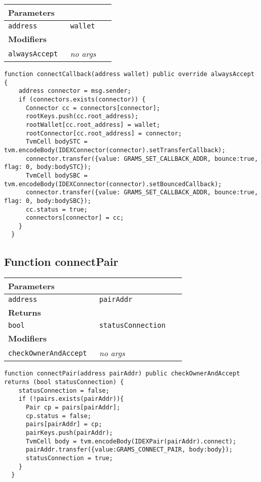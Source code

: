 \ifsoltables
\noindent\begin{tabular}{|l|l|p{5cm}|}\hline
\multicolumn{3}{|l|}{\bf Parameters}\\\hline
\tt address & \tt wallet &\\\hline
\multicolumn{3}{|l|}{\bf Modifiers}\\\hline
\tt alwaysAccept & {\em no args} &\\\hline
\end{tabular}
\fi



\begin{lstlisting}[firstnumber=181]
  function connectCallback(address wallet) public override alwaysAccept {
    address connector = msg.sender;
    if (connectors.exists(connector)) {
      Connector cc = connectors[connector];
      rootKeys.push(cc.root_address);
      rootWallet[cc.root_address] = wallet;
      rootConnector[cc.root_address] = connector;
      TvmCell bodySTC = tvm.encodeBody(IDEXConnector(connector).setTransferCallback);
      connector.transfer({value: GRAMS_SET_CALLBACK_ADDR, bounce:true, flag: 0, body:bodySTC});
      TvmCell bodySBC = tvm.encodeBody(IDEXConnector(connector).setBouncedCallback);
      connector.transfer({value: GRAMS_SET_CALLBACK_ADDR, bounce:true, flag: 0, body:bodySBC});
      cc.status = true;
      connectors[connector] = cc;
    }
  }
\end{lstlisting}

\subsection{Function connectPair}


\ifsoltables
\noindent\begin{tabular}{|l|l|p{5cm}|}\hline
\multicolumn{3}{|l|}{\bf Parameters}\\\hline
\tt address & \tt pairAddr &\\\hline
\multicolumn{3}{|l|}{\bf Returns}\\\hline
\tt bool & \tt statusConnection &\\\hline
\multicolumn{3}{|l|}{\bf Modifiers}\\\hline
\tt checkOwnerAndAccept & {\em no args} &\\\hline
\end{tabular}
\fi



\begin{lstlisting}[firstnumber=92]
  function connectPair(address pairAddr) public checkOwnerAndAccept  returns (bool statusConnection) {
    statusConnection = false;
    if (!pairs.exists(pairAddr)){
      Pair cp = pairs[pairAddr];
      cp.status = false;
      pairs[pairAddr] = cp;
      pairKeys.push(pairAddr);
      TvmCell body = tvm.encodeBody(IDEXPair(pairAddr).connect);
      pairAddr.transfer({value:GRAMS_CONNECT_PAIR, body:body});
      statusConnection = true;
    }
  }
\end{lstlisting}

